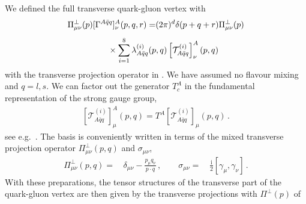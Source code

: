 \documentclass[aps,twocolumn,prd,superscriptaddress]{revtex4-2}
\begin{document}
We defined the full transverse quark-gluon vertex with 
%
\begin{align}\nonumber 
	\Pi^\bot_{\mu\nu}(p) [\Gamma^{A \bar q q}]^A_\nu(p,q,r) = &(2\pi)^d\delta(p+q+r)\Pi^\bot_{\mu\nu}(p) 
	 \\[1ex]  &\hspace{-2cm}\times \sum_{i=1}^8 \lambda^{(i)}_{A\bar q q}(p,q)    	 \left[\mathcal{T}_{A\bar{q}q}^{(i)}\right]^A_\nu(p,q) 
	\label{eq:TransverseAbarqq}
\end{align}
%
with the transverse projection operator in . We have assumed no flavour mixing and $q=l, s$. We can factor out the generator $T_c^A$ in the fundamental representation of the strong gauge group, 
%
\begin{align}
\left[\mathcal{T}_{A\bar{q}q}^{(i)}\right]^A_\mu(p,q) = T^A \left[\mathcal{T}_{A\bar{q}q}^{(i)}\right]_\mu(p,q)\,.
\label{eq:qbarqAFactor}
\end{align}
%
see e.g.~\cite{Mitter:2014wpa, Eichmann:2016yit, Cyrol:2017ewj, Gao:2021vsf}. The basis is conveniently written in terms of the mixed transverse projection operator $	\Pi_{\mu\nu}^\perp(p,q) $ and $\sigma_{\mu\nu}$, 
%
\begin{align}
	\Pi_{\mu\nu}^\perp(p,q)     =&\, \delta_{\mu\nu} - \frac{p_\mu q_\nu}{p\cdot q}\,, \qquad \sigma_{\mu\nu} =&\, \frac{{\textrm{i}}}{2} [\gamma_\mu,\gamma_\nu]\,.
	\label{eq:ProjectionOps2}
\end{align}
%
With these preparations, the tensor structures of the transverse part of the quark-gluon vertex are then given by the transverse projections with $\Pi^\bot(p)$ of 
%
\end{document}
